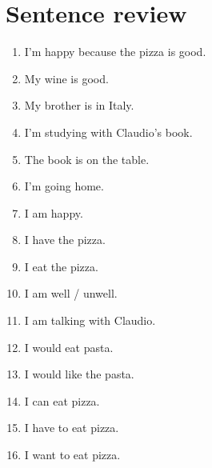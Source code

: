 \section{Sentence review}
\begin{enumerate}
	\item I'm happy because the pizza is good. \\ 
	\item My wine is good.  \\ 
    \item My brother is in Italy.  \\ 
    \item I'm studying with Claudio's book.  \\
    \item The book is on the table. \\
    \item{I'm going home.} \\
    \item I am happy. \\
    \item I have the pizza. \\
    \item I eat the pizza. \\
    \item I am well / unwell. \\
    \item I am talking with Claudio.  \\ 
    \item I would eat pasta.  \\
    \item I would like the pasta. \\
    \item I can eat pizza.  \\
    \item I have to eat pizza.  \\
    \item I want to eat pizza.  \\
\end{enumerate}


